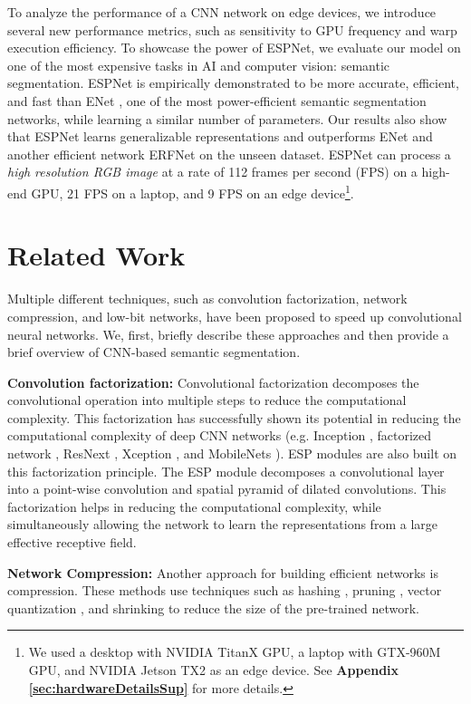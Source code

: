 \documentclass[runningheads]{llncs}
\begin{document}
To analyze the performance of a CNN network on edge devices, we introduce several new performance metrics, such as sensitivity to GPU frequency and warp execution efficiency.
To showcase the power of ESPNet, we evaluate our model on one of the most expensive tasks in AI and computer vision: semantic segmentation. ESPNet is empirically demonstrated to be more accurate, efficient, and fast than ENet \cite{paszke2016enet}, one of the most power-efficient semantic segmentation networks, while learning a similar number of parameters. Our results also show that ESPNet learns generalizable representations and outperforms ENet \cite{paszke2016enet} and another efficient network ERFNet \cite{romera2018erfnet} on the unseen dataset. ESPNet can process a \textit{high resolution RGB image} at a rate of 112 frames per second (FPS) on a high-end GPU, 21 FPS on a laptop, and 9 FPS on an edge device\footnote{We used a desktop with NVIDIA TitanX GPU, a laptop with GTX-960M GPU, and NVIDIA Jetson TX2 as an edge device. See \textbf{Appendix \ref{sec:hardwareDetailsSup}} for more details.}.  

\section{Related Work}
Multiple different techniques, such as convolution factorization, network compression, and low-bit networks, have been proposed to speed up convolutional neural networks. We, first, briefly describe these approaches and then provide a brief overview of CNN-based semantic segmentation.

\noindent \textbf{Convolution factorization:} Convolutional factorization decomposes the convolutional operation into multiple steps to reduce the computational complexity. This factorization has successfully shown its potential in reducing the computational complexity of deep CNN networks (e.g. Inception \cite{szegedy2015going,szegedy2016rethinking,SzegedyIV16InceptionV4}, factorized network \cite{jin2014flattened}, ResNext \cite{xie2017aggregated}, Xception \cite{chollet2016xception}, and MobileNets \cite{howard2017mobilenets}). ESP modules are also built on this factorization principle. The ESP module decomposes a convolutional layer into a point-wise convolution and spatial pyramid of dilated convolutions. This factorization helps in reducing the computational complexity, while simultaneously allowing the network to learn the representations from a large effective receptive field.

\noindent \textbf{Network Compression:} Another approach for building efficient networks is compression. These methods use techniques such as hashing \cite{chen2015compressing}, pruning \cite{han2015deep}, vector quantization \cite{wu2016quantized}, and shrinking \cite{zhao2017icnet,jaderberg2014speeding} to reduce the size of the pre-trained network.
\end{document}
